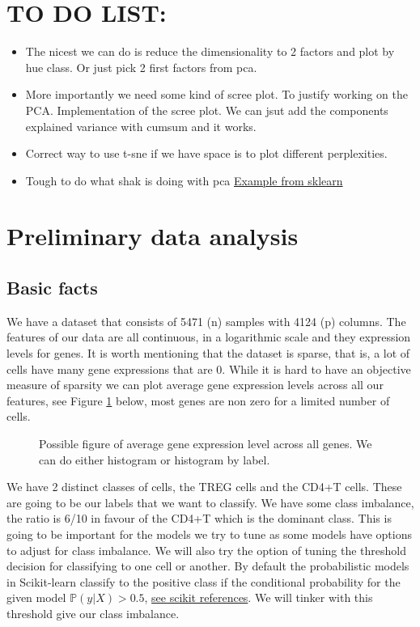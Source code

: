 \documentclass{article}
\begin{document}
\section{TO DO LIST:}
\begin{itemize}
    \item The nicest we can do is reduce the dimensionality to 2 factors and plot by hue class. 
    Or just pick 2 first factors from pca.
    \item More importantly we need some kind of scree plot. To justify working on the PCA. Implementation of the scree plot. We can 
    jsut add the components explained variance with cumsum and it works.
    \item Correct way to use t-sne if we have space is to plot different perplexities.
    \item Tough to do what shak is doing with pca \href{https://scikit-learn.org/1.5/auto_examples/compose/plot_digits_pipe.html}{Example from sklearn}

\end{itemize}
\section{Preliminary data analysis}

\subsection{Basic facts}
We have a dataset that consists of 5471 (n) samples with 4124 (p) columns. The features of our data are all continuous, in a logarithmic scale and they expression levels 
for genes. It is worth mentioning that the dataset is sparse, that is, a lot of cells have many gene expressions that are 0. While it is hard to have an objective measure
of sparsity we can plot average gene expression levels across all our features, see Figure \ref{fig:hist_sparse} below, most genes are non zero for a limited number of cells.

\begin{figure}[h]

    
    \caption{Possible figure of average gene expression level across all genes. We can do either histogram or histogram by label.}\label{fig:hist_sparse}
\end{figure}


We have 2 distinct classes of cells, the TREG cells and the 
CD4+T cells. These are going to be our labels that we want to classify. We have some class imbalance, the ratio is 6/10 in favour of the CD4+T 
which is the dominant class. This is going to be important for the models we try to tune as some models have options to adjust for class imbalance.
We will also try the option of tuning the threshold decision for classifying to one cell or another. By default the probabilistic models in Scikit-learn
classify to the positive class if the conditional probability for the given model $\mathbb{P}(\textit{y}|X) > 0.5$, \href{https://scikit-learn.org/1.5/modules/classification_threshold.html}{see scikit references}. 
We will tinker with this threshold give our class imbalance.  
\end{document}
